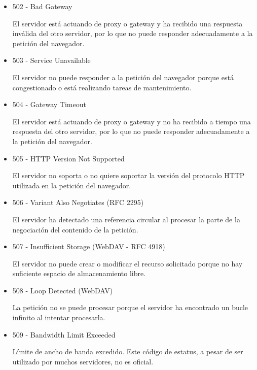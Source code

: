 \documentclass[a4paper,10pt]{article}
\begin{document}
\begin{enumerate}
\begin{enumerate}
\begin{itemize}
\begin{itemize}
                            \item 502 - Bad Gateway

                            El servidor está actuando de proxy o gateway y ha recibido una respuesta inválida del otro servidor, por lo que no puede responder adecuadamente a la petición del navegador.

                            \item 503 - Service Unavailable

                            El servidor no puede responder a la petición del navegador porque está congestionado o está realizando tareas de mantenimiento.

                            \item 504 - Gateway Timeout

                            El servidor está actuando de proxy o gateway y no ha recibido a tiempo una respuesta del otro servidor, por lo que no puede responder adecuadamente a la petición del navegador.

                            \item 505 - HTTP Version Not Supported

                            El servidor no soporta o no quiere soportar la versión del protocolo HTTP utilizada en la petición del navegador.

                            \item 506 - Variant Also Negotiates (RFC 2295)

                            El servidor ha detectado una referencia circular al procesar la parte de la negociación del contenido de la petición.

                            \item 507 - Insufficient Storage (WebDAV - RFC 4918)

                            El servidor no puede crear o modificar el recurso solicitado porque no hay suficiente espacio de almacenamiento libre.

                            \item 508 - Loop Detected (WebDAV)

                            La petición no se puede procesar porque el servidor ha encontrado un bucle infinito al intentar procesarla.

                            \item 509 - Bandwidth Limit Exceeded

                            Límite de ancho de banda excedido. Este código de estatus, a pesar de ser utilizado por muchos servidores, no es oficial.


\end{itemize}
\end{itemize}
\end{enumerate}
\end{enumerate}
\end{document}
